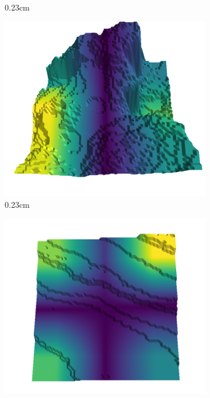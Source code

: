 \documentclass[../document.tex]{subfiles}
\begin{document}
\begin{figure}[H]
\begin{subfigure}[b]{0.242\linewidth}
            \caption{0.23cm}
            \end{subfigure}
            \begin{subfigure}[b]{0.242\linewidth}
            \includegraphics[width=\linewidth]{../img/5/quarry/false_positive/30-patch-3d-majavi-colormap-60.png}
            \caption{0.23cm}
            \end{subfigure}
            \begin{subfigure}[b]{0.242\linewidth}
            \includegraphics[width=\linewidth]{../img/5/quarry/false_positive/33-patch-3d-majavi-colormap-65.png}

\end{subfigure}
\end{figure}
\end{document}
